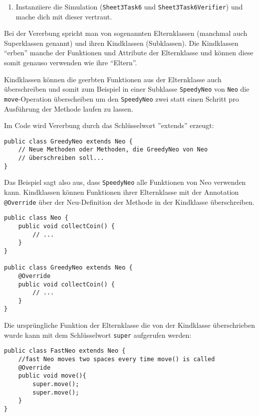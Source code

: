 \begin{enumerate}
	\item
	Instanziiere die Simulation (\lstinline{Sheet3Task6} und  \lstinline{Sheet3Task6Verifier}) und mache dich mit dieser vertraut.
\end{enumerate}

\begin{Infobox}[Vererbung]


Bei der Vererbung spricht man von sogenannten Elternklassen (manchmal auch Superklassen genannt) und ihren Kindklassen (Subklassen).
Die Kindklassen \enquote{erben} manche der Funktionen und Attribute der Elternklasse und können diese somit genauso verwenden wie ihre \enquote{Eltern}.\newline

Kindklassen können die geerbten Funktionen aus der Elternklasse auch überschreiben und somit zum Beispiel in einer Subklasse \lstinline{SpeedyNeo} von \lstinline{Neo} die \lstinline{move}-Operation überscheiben um den \lstinline{SpeedyNeo} zwei statt einen Schritt pro Ausführung der Methode laufen zu lassen.

Im Code wird Vererbung durch das Schlüsselwort ''extends'' erzeugt:

\begin{lstlisting}[xleftmargin=0.5cm]
public class GreedyNeo extends Neo {
	// Neue Methoden oder Methoden, die GreedyNeo von Neo
	// überschreiben soll...
}
\end{lstlisting}

Das Beispiel sagt also aus, dass \lstinline{SpeedyNeo} alle Funktionen von Neo verwenden kann.\newline
Kindklassen können Funktionen ihrer Elternklasse mit der Annotation \lstinline{@Override} über der Neu-Definition der Methode in der Kindklasse überschreiben.

\begin{lstlisting}[xleftmargin=0.5cm]
public class Neo {
	public void collectCoin() {
		// ...
	}
}

public class GreedyNeo extends Neo {
	@Override
	public void collectCoin() {
		// ...
	}
}
\end{lstlisting}
Die ursprüngliche Funktion der Elternklasse die von der Kindklasse überschrieben wurde kann mit dem Schlüsselwort \lstinline{super} aufgerufen werden:
\begin{lstlisting}[xleftmargin=0.5cm]
public class FastNeo extends Neo {
	//fast Neo moves two spaces every time move() is called
	@Override
	public void move(){
		super.move();
		super.move();
	}
}
\end{lstlisting}
\end{Infobox}


